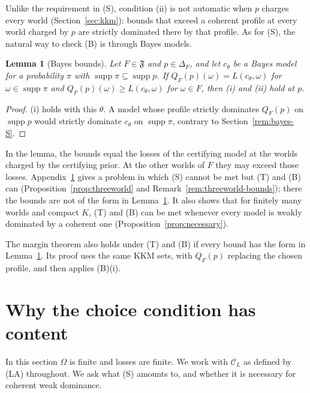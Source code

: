 \documentclass[11pt]{article}
\newtheorem{lemma}[theorem]{Lemma}
\theoremstyle{definition}
\theoremstyle{remark}
\newcommand{\C}{\mathcal C}
\newcommand{\F}{\mathfrak F}
\newcommand{\supp}{\operatorname{supp}}
\begin{document}
Unlike the requirement in (S), condition (ii) is not automatic when $p$ charges every world (Section~\ref{sec:kkm}): bounds that exceed a coherent profile at every world charged by $p$ are strictly dominated there by that profile. As for (S), the natural way to check (B) is through Bayes models.

\begin{lemma}[Bayes bounds]\label{lem:bayesbounds}
Let $F\in\F$ and $p\in\Delta_F$, and let $c_\theta$ be a Bayes model for a probability $\pi$ with $\supp\pi\subseteq\supp p$. If $Q_F(p)(\omega)=L(c_\theta,\omega)$ for $\omega\in\supp\pi$ and $Q_F(p)(\omega)\ge L(c_\theta,\omega)$ for $\omega\in F$, then (i) and (ii) hold at $p$.
\end{lemma}
\begin{proof}
(i) holds with this $\theta$. A model whose profile strictly dominates $Q_F(p)$ on $\supp p$ would strictly dominate $c_\theta$ on $\supp\pi$, contrary to Section~\ref{rem:bayes-S}.
\end{proof}
In the lemma, the bounds equal the losses of the certifying model at the worlds charged by the certifying prior. At the other worlds of $F$ they may exceed those losses. Appendix~\ref{sec:finite} gives a problem in which (S) cannot be met but (T) and (B) can (Proposition~\ref{prop:threeworld} and Remark~\ref{rem:threeworld-bounds}); there the bounds are not of the form in Lemma~\ref{lem:bayesbounds}. It also shows that for finitely many worlds and compact $K$, (T) and (B) can be met whenever every model is weakly dominated by a coherent one (Proposition~\ref{prop:necessary}).


The margin theorem also holds under (T) and (B) if every bound has the form in Lemma~\ref{lem:bayesbounds}. Its proof uses the same KKM sets, with $Q_F(p)$ replacing the chosen profile, and then applies (B)(i).
\section{Why the choice condition has content}\label{sec:finite}
In this section $\Omega$ is finite and losses are finite. We work with $\C_L$ as defined by (LA) throughout. We ask what (S) amounts to, and whether it is necessary for coherent weak dominance.
\end{document}
